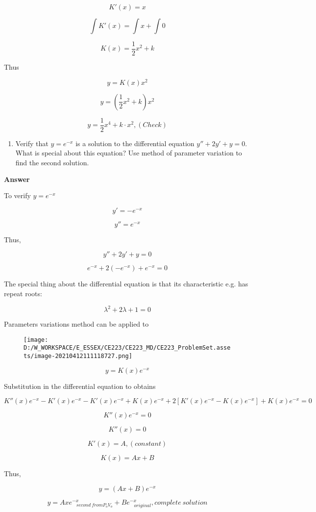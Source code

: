 \documentclass[
]{article}
\begin{document}
\[K'(x) = x\]

\[\int K'(x) =\int x+ \int0\]

\[K(x) = \frac{1}{2} x^2 + k\]

Thus

\[y = K(x) x^2\]

\[y =  (\frac{1}{2} x^2 + k ) x^2\]

\[y =  \frac{1}{2} x^4 + k·x^2, (Check)\]

\begin{enumerate}
\def\labelenumi{\arabic{enumi}.}
\item
  Verify that \(y = e^{−x}\) is a solution to the differential equation
  \(y''+2y'+y = 0\). What is special about this equation? Use method of
  parameter variation to find the second solution.
\end{enumerate}

\textbf{Answer}

To verify \(y = e^{−x}\)

\[y ' = -e^{-x}\]

\[y'' = e^{-x}\]

Thus,

\[y''+2y'+y = 0\]

\[e^{-x} + 2(-e^{-x})+e^{-x} = 0\]

The special thing about the differential equation is that its
characteristic e.g. has repeat roots:

\[\lambda^2 + 2\lambda+1 = 0\]

Parameters variations method can be applied to

\begin{figure}
\centering
\texttt{[image: D:/W\_WORKSPACE/E\_ESSEX/CE223/CE223\_MD/CE223\_ProblemSet.assets/image-20210412111118727.png]}
\caption{}
\end{figure}

\[y = K(x)e^{-x}\]

Substitution in the differential equation to obtains

\[K''(x)e^{-x}-K'(x)e^{-x}-K'(x)e^{-x}+K(x)e^{-x}+2[K'(x)e^{-x} - K(x)e^{-x}] + K(x)e^{-x} = 0\]

\[K''(x)e^{-x} = 0\]

\[K''(x) = 0\]

\[K'(x) = A , (constant)\]

\[K(x) = Ax + B\]

Thus,

\[y = (Ax +B) e^{-x}\]

\[y = Axe^{-x}_{\ \ \ \ second\ from P_oV_o} + Be^{-x}_{\ \ \ \ original }, complete\ solution\]
\end{document}
